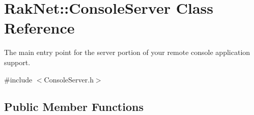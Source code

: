 \hypertarget{class_rak_net_1_1_console_server}{\section{Rak\-Net\-:\-:Console\-Server Class Reference}
\label{class_rak_net_1_1_console_server}
}


The main entry point for the server portion of your remote console application support.  




{\ttfamily \#include $<$Console\-Server.\-h$>$}

\subsection*{Public Member Functions}
